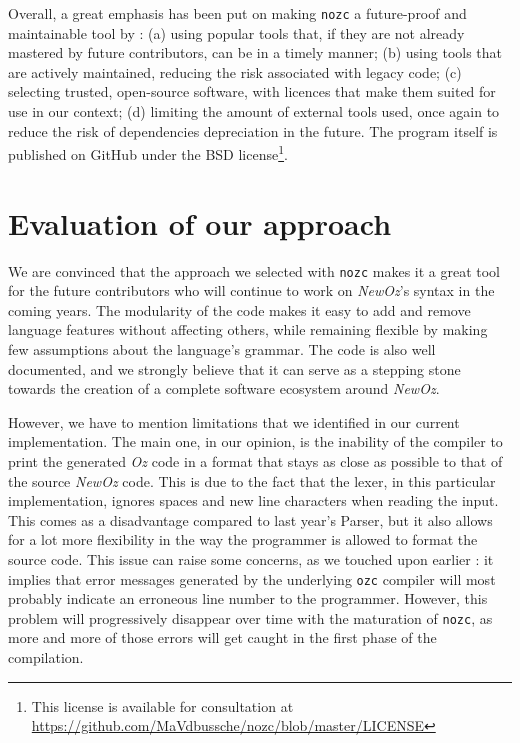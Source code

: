 Overall, a great emphasis has been put on making \texttt{nozc} a future-proof and maintainable tool by : (a) using popular tools that, if they are not already mastered by future contributors, can be in a timely manner; (b) using tools that are actively maintained, reducing the risk associated with legacy code; (c) selecting trusted, open-source software, with licences that make them suited for use in our context; (d) limiting the amount of external tools used, once again to reduce the risk of dependencies depreciation in the future.\newline
The program itself is published on GitHub under the BSD license\footnote{This license is available for consultation at \url{https://github.com/MaVdbussche/nozc/blob/master/LICENSE}}.

\section{Evaluation of our approach}\label{sec:ch3-pros-cons}
We are convinced that the approach we selected with \texttt{nozc} makes it a great tool for the future contributors who will continue to work on \textit{NewOz}'s syntax in the coming years.
The modularity of the code makes it easy to add and remove language features without affecting others, while remaining flexible by making few assumptions about the language's grammar.
The code is also well documented, and we strongly believe that it can serve as a stepping stone towards the creation of a complete software ecosystem around \textit{NewOz}.\newline

However, we have to mention limitations that we identified in our current implementation.\newline
The main one, in our opinion, is the inability of the compiler to print the generated \textit{Oz} code in a format that stays as close as possible to that of the source \textit{NewOz} code.
This is due to the fact that the lexer, in this particular implementation, ignores spaces and new line characters when reading the input.
This comes as a disadvantage compared to last year's Parser, but it also allows for a lot more flexibility in the way the programmer is allowed to format the source code.
This issue can raise some concerns, as we touched upon earlier : it implies that error messages generated by the underlying \texttt{ozc} compiler will most probably indicate an erroneous line number to the programmer.
However, this problem will progressively disappear over time with the maturation of \texttt{nozc}, as more and more of those errors will get caught in the first phase of the compilation.\newline


